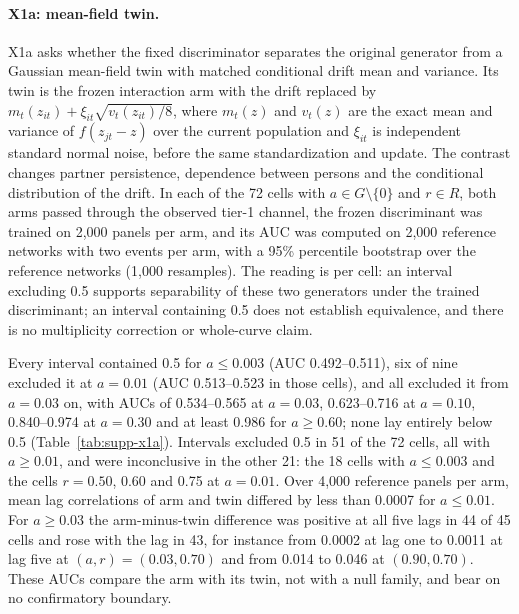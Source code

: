 \paragraph{X1a: mean-field twin.}
X1a asks whether the fixed discriminator separates the original generator from a Gaussian mean-field twin with matched conditional drift mean and variance. %
Its twin is the frozen interaction arm with the drift replaced by $m_t(z_{it})+\xi_{it}\sqrt{v_t(z_{it})/8}$, where $m_t(z)$ and $v_t(z)$ are the exact mean and variance of $f(z_{jt}-z)$ over the current population and $\xi_{it}$ is independent standard normal noise, before the same standardization and update. %
The contrast changes partner persistence, dependence between persons and the conditional distribution of the drift. %
In each of the 72 cells with $a\in G\setminus\{0\}$ and $r\in R$, both arms passed through the observed tier-1 channel, the frozen discriminant was trained on 2,000 panels per arm, and its AUC was computed on 2,000 reference networks with two events per arm, with a 95\% percentile bootstrap over the reference networks (1,000 resamples). %
The reading is per cell: an interval excluding 0.5 supports separability of these two generators under the trained discriminant; an interval containing 0.5 does not establish equivalence, and there is no multiplicity correction or whole-curve claim. %

Every interval contained 0.5 for $a\leq0.003$ (AUC 0.492--0.511), six of nine excluded it at $a=0.01$ (AUC 0.513--0.523 in those cells), and all excluded it from $a=0.03$ on, with AUCs of 0.534--0.565 at $a=0.03$, 0.623--0.716 at $a=0.10$, 0.840--0.974 at $a=0.30$ and at least 0.986 for $a\geq0.60$; none lay entirely below 0.5 (Table~\ref{tab:supp-x1a}). %
Intervals excluded 0.5 in 51 of the 72 cells, all with $a\geq0.01$, and were inconclusive in the other 21: the 18 cells with $a\leq0.003$ and the cells $r=0.50$, 0.60 and 0.75 at $a=0.01$. %
Over 4,000 reference panels per arm, mean lag correlations of arm and twin differed by less than 0.0007 for $a\leq0.01$. %
For $a\geq0.03$ the arm-minus-twin difference was positive at all five lags in 44 of 45 cells and rose with the lag in 43, for instance from 0.0002 at lag one to 0.0011 at lag five at $(a,r)=(0.03,0.70)$ and from 0.014 to 0.046 at $(0.90,0.70)$. %
These AUCs compare the arm with its twin, not with a null family, and bear on no confirmatory boundary. %

